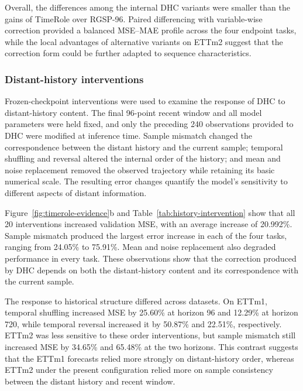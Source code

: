 Overall, the differences among the internal DHC variants were smaller than the gains of TimeRole over RGSP-96. Paired differencing with variable-wise correction provided a balanced MSE--MAE profile across the four endpoint tasks, while the local advantages of alternative variants on ETTm2 suggest that the correction form could be further adapted to sequence characteristics.

\subsubsection{Distant-history interventions}

Frozen-checkpoint interventions were used to examine the response of DHC to distant-history content. The final 96-point recent window and all model parameters were held fixed, and only the preceding 240 observations provided to DHC were modified at inference time. Sample mismatch changed the correspondence between the distant history and the current sample; temporal shuffling and reversal altered the internal order of the history; and mean and noise replacement removed the observed trajectory while retaining its basic numerical scale. The resulting error changes quantify the model's sensitivity to different aspects of distant information.

Figure~\ref{fig:timerole-evidence}b and Table~\ref{tab:history-intervention} show that all 20 interventions increased validation MSE, with an average increase of 20.992\%. Sample mismatch produced the largest error increase in each of the four tasks, ranging from 24.05\% to 75.91\%. Mean and noise replacement also degraded performance in every task. These observations show that the correction produced by DHC depends on both the distant-history content and its correspondence with the current sample.

The response to historical structure differed across datasets. On ETTm1, temporal shuffling increased MSE by 25.60\% at horizon 96 and 12.29\% at horizon 720, while temporal reversal increased it by 50.87\% and 22.51\%, respectively. ETTm2 was less sensitive to these order interventions, but sample mismatch still increased MSE by 34.65\% and 65.48\% at the two horizons. This contrast suggests that the ETTm1 forecasts relied more strongly on distant-history order, whereas ETTm2 under the present configuration relied more on sample consistency between the distant history and recent window.

